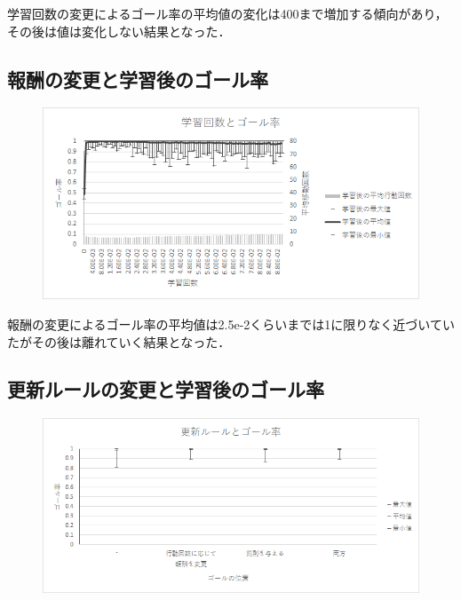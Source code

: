 \documentclass[a4j,11pt]{jarticle}
\begin{document}
学習回数の変更によるゴール率の平均値の変化は400まで増加する傾向があり，その後は値は変化しない結果となった．

\subsection{報酬の変更と学習後のゴール率}

\begin{figure}[ht]
  \begin{center}
    \includegraphics[scale=1.5]{img/valP.png}
  \end{center}
\end{figure}

報酬の変更によるゴール率の平均値は2.5e-2くらいまでは1に限りなく近づいていたがその後は離れていく結果となった．

\newpage

\subsection{更新ルールの変更と学習後のゴール率}

\begin{figure}[ht]
  \begin{center}
    \includegraphics[scale=1.5]{img/valRule.png}
  \end{center}
\end{figure}
\end{document}
